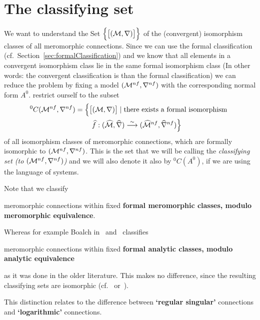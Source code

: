 \section{The classifying set}\label{sec:classifyingSet}
We want to understand the Set
$\Big\{\big[(\mathcal{M},\nabla)\big]\Big\}$ of the (convergent)
isomorphism classes of all meromorphic connections. Since we can use the formal
classification (cf.\ Section~\ref{sec:formalClassification}) and we know that
all elements in a convergent isomorphism class lie in the same formal
isomorphism class (In other words: the convergent classification is
 than the formal classification) we can reduce the problem by
fixing a model $(\mathcal{M}^{nf},\nabla^{nf})$ with the corresponding normal form
$A^0$.
 restrict ourself to the subset
\begin{multline*}
  {}^0C(\mathcal{M}^{nf},\nabla^{nf})=\Big\{
    \big[(\mathcal{M},\nabla)\big]
    \mid \text{there exists a formal isomorphism }
  \\\qquad\widehat f:(\widehat{\mathcal{M}},\widehat\nabla)
      \overset{\sim}\longrightarrow
      (\widehat{\mathcal{M}}^{nf},\widehat\nabla^{nf})
  \Big\}
\end{multline*}
of all isomorphism classes of meromorphic connections, which are formally
isomorphic to $(\mathcal{M}^{nf},\nabla^{nf})$. This is the set that we will be
calling the \emph{classifying set (to $(\mathcal{M}^{nf},\nabla^{nf})$)} and we will
also denote it also by ${}^0C(A^0)$, if we are using the language of systems.
\begin{rem}
  Note that we classify
  \begin{einr}
    meromorphic connections within fixed \textbf{formal meromorphic classes,
    modulo meromorphic equivalence}.
  \end{einr}
  Whereas for example Boalch in~\cite{boalch} and~\cite{thboalch} classifies
  \begin{einr}
    meromorphic connections within fixed \textbf{formal analytic classes,
    modulo analytic equivalence}
  \end{einr}
  as it was done in the older literature.
  This makes no difference, since the resulting classifying sets are isomorphic
  (cf.~\cite{thboalch} or~\cite{babbitt1989local}).

  This distinction relates to the difference between \textbf{‘regular
  singular’} connections and \textbf{‘logarithmic’} connections.
\end{rem}
